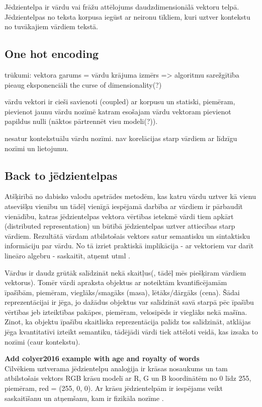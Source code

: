 Jēdzientelpa ir vārdu vai frāžu attēlojums daudzdimensionālā vektoru telpā. Jēdzientelpas no teksta korpusa iegūst ar neironu tīkliem, kuri uztver kontekstu no tuvākajiem vārdiem tekstā. 

\subsection{One hot encoding}

trūkumi:
vektora garums = vārdu krājuma izmērs => algoritmu sarežgītība pieaug eksponenciāli the curse of dimensionality(?)

vārdu vektori ir cieši savienoti (coupled) ar korpusu un statiski, piemēram, pievienot jaunu vārdu nozīmē katram esošajam vārdu vektoram pievienot papildus nulli (nāktos pārtrennēt visu modeli(?)).

nesatur kontekstuālu vārdu nozīmi. nav korelācijas starp vārdiem ar līdzīgu nozīmi un lietojumu.


\subsection{Back to jēdzientelpas}

Atšķirībā no dabisko valodu apstrādes metodēm, kas katru vārdu uztver kā vienu atsevišķu vienību un tādēļ vienīgā iespējamā darbība ar vārdiem ir pārbaudīt vienādību, katras jēdzientelpas vektora vērtības ietekmē vārdi tiem apkārt (distributed representation) un būtībā jēdzientelpas uztver attiecības starp vārdiem. Rezultātā vārdam atbilstošais vektors satur semantisku un sintaktisku informāciju par vārdu. No tā izriet praktiskā implikācija - ar vektoriem var darīt lineāro algebru - saskaitīt, atņemt utml \cite{colyer2016}.

Vārdus ir daudz grūtāk salīdzināt nekā skaitļus(, tādēļ mēs piešķiram vārdiem vektorus). Tomēr vārdi apraksta objektus ar noteiktām kvantificējamām īpašībām, piemēram, vieglāks/smagāks (masa), lētāks/dārgāks (cena). Šādai reprezentācijai ir jēga, jo dažādus objektus var salīdzināt savā starpā pēc īpašību vērtības jeb izteiktības pakāpes, piemēram, velosipēds ir vieglāks nekā mašīna. Zinot, ka objektu īpašību skaitliska reprezentācija palīdz tos salīdzināt, atklājas jēga kvantitatīvi izteikt semantiku, tādējādi vārdi tiek attēloti veidā, kas izsaka to nozīmi (caur kontekstu). 

\textbf{Add colyer2016 example with age and royalty of words}\\

Cilvēkiem uztverama jēdzientelpu analoģija ir krāsas nosaukums un tam atbilstošais vektors RGB krāsu modelī ar R, G un B koordinātēm no 0 līdz 255, piemēram, red = (255, 0, 0). Ar krāsu jēdzientelpām ir iespējams veikt saskaitīšanu un atņemšanu, kam ir fizikāla nozīme \cite{parrish2017}.


